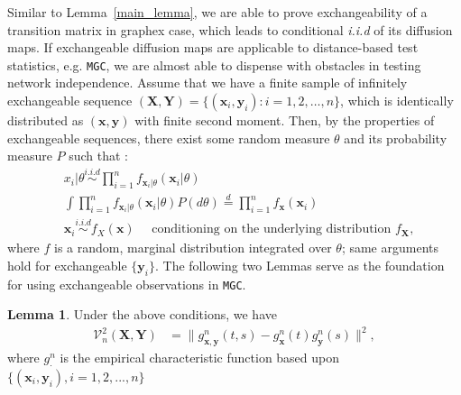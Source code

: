 \documentclass[12pt]{article}
\theoremstyle{definition}
\newtheorem{lemma}[theorem]{Lemma}
\begin{document}
Similar to Lemma~\ref{main_lemma}, we are able to prove exchangeability of a transition matrix in graphex case, which leads to conditional \textit{i.i.d} of its diffusion maps. If exchangeable diffusion maps are applicable to distance-based test statistics, e.g. \texttt{MGC}, we are almost able to dispense with obstacles in testing network independence. Assume that we have a finite sample of infinitely exchangeable sequence $(\mathbf{X}, \mathbf{Y}) = \{ ( \mathbf{x}_{i}, \mathbf{y}_{i} ) : i=1,2, \ldots, n \}$, which is identically distributed as $(\mathbf{x}, \mathbf{y})$ with finite second moment. Then, by the properties of exchangeable sequences, there exist some random measure $\theta$ and its probability measure $P$ such that : 
\begin{equation}
\begin{split}
& x_{i} | \theta  \overset{i.i.d}{\sim} \prod\limits_{i=1}^{n} f_{\mathbf{x}_{i} | \theta}(\mathbf{x}_{i} | \theta)  \\
& \int \prod\limits_{i=1}^{n} f_{ \mathbf{x}_{i} | \theta} ( \mathbf{x}_{i} | \theta ) P(d\theta)  \stackrel{d}{=}   \prod\limits_{i=1}^{n} f_{\mathbf{x}}(\mathbf{x}_{i})  \\
& \mathbf{x}_{i}   \overset{i.i.d}{\sim}  f_{X}(\mathbf{x})  \quad \mbox{ conditioning on the underlying distribution } f_{\mathbf{X}},
\end{split}
\label{eq:iid}
\end{equation}
where $f$ is a random, marginal distribution integrated over $\theta$; same arguments hold for exchangeable $\{ \mathbf{y}_{i}  \}$. The following two Lemmas serve as the foundation for using exchangeable observations in \texttt{MGC}.

\begin{lemma}
	\label{lemma1}
   Under the above conditions, we have 
	\begin{eqnarray*}
		\mathcal{V}^{2}_{n}(\mathbf{X},\mathbf{Y}) &= \|g_{\mathbf{x},\mathbf{y}}^{n}(t,s)-g_{\mathbf{x}}^{n}(t)g_{\mathbf{y}}^{n}(s)\|^{2},
	\end{eqnarray*}
	where $g_{\cdot}^{n}$ is the empirical characteristic function based upon $\{(\mathbf{x}_{i},\mathbf{y}_{i}), i=1,2,...,n\}$
\end{lemma}
\end{document}
